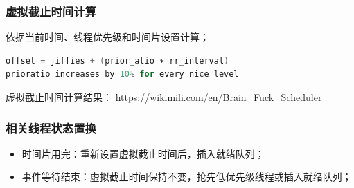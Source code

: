 % 
% 
% 
% 
% 
% 
\begin{frame}[fragile]
    \frametitle{虚拟截止时间计算}

依据当前时间、线程优先级和时间片设置计算；

    \begin{lstlisting}[language = C]
offset = jiffies + (prior_atio ∗ rr_interval)
prioratio increases by 10% for every nice level
    \end{lstlisting} \pause

虚拟截止时间计算结果： \href{https://wikimili.com/en/Brain_Fuck_Scheduler}{https://wikimili.com/en/Brain\_Fuck\_Scheduler}
\end{frame}
% 
% 
% 
\begin{frame}[fragile]
    \frametitle{相关线程状态置换}
    \begin{itemize}
        \item 时间片用完：重新设置虚拟截止时间后，插入就绪队列；
        \item 事件等待结束：虚拟截止时间保持不变，抢先低优先级线程或插入就绪队列；
    \end{itemize}

\end{frame}
% 
% 
% 

